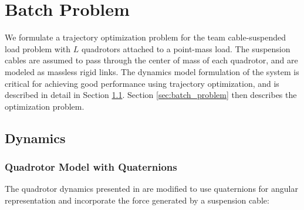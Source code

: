 \documentclass[../root.tex]{subfiles}
\begin{document}
\section{Batch Problem}\label{batch_problem}
We formulate a trajectory optimization problem for the team cable-suspended
load problem with $L$ quadrotors attached to a point-mass load. The
suspension cables are assumed to pass through the center of mass of each
quadrotor, and are modeled as massless rigid links. The dynamics model
formulation of the system is critical for
achieving good performance using trajectory optimization,
and is described in detail in Section \ref{sec:dynamics}. Section
\ref{sec:batch_problem} then describes the optimization problem.

\subsection{Dynamics} \label{sec:dynamics}
\subsubsection{Quadrotor Model with Quaternions} 
The quadrotor dynamics presented in \cite{mellinger_Trajectory_2012} are
modified to use quaternions for angular representation and incorporate the
force generated by a suspension cable:
\end{document}
